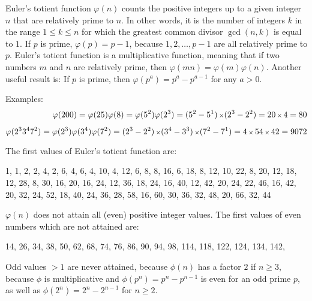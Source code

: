Euler's totient function $\varphi(n)$ counts the positive integers up to a given integer $n$ that are relatively prime to $n$.  In other words, it is the number of integers $k$ in the range $1 \le k \le n$ for which the greatest common divisor $\gcd(n, k)$ is equal to $1$. If $p$ is prime, $\varphi(p)=p-1$, because $1,2,\ldots,p-1$ are all relatively prime to $p$. Euler's totient function is a multiplicative function, meaning that if two numbers $m$ and $n$ are relatively prime, then $\varphi(mn)=\varphi(m)\varphi(n)$. Another useful result is: If $p$ is prime, then $\varphi(p^{a})=p^{a}-p^{a-1}$ for any $a>0$.

Examples: 
\begin{align*}
\varphi(200) 
 = \varphi(25) \varphi(8)
 = \varphi(5^{2}) \varphi(2^{3})
 = (5^{2}-5^{1}) \operatorname{\mbox{\scriptsize$\times$}} (2^{3}-2^{2})
 = 20 \operatorname{\mbox{\scriptsize$\times$}} 4
 = 80
\\[1ex]
\varphi(2^{3}3^{4}7^{2}) 
 = \varphi(2^{3}) \varphi(3^{4}) \varphi(7^{2})
 = (2^{3}-2^{2}) \operatorname{\mbox{\scriptsize$\times$}} (3^{4}-3^{3}) \operatorname{\mbox{\scriptsize$\times$}} (7^{2}-7^{1})
 = 4 \operatorname{\mbox{\scriptsize$\times$}} 54 \operatorname{\mbox{\scriptsize$\times$}} 42
 = 9072
\end{align*}

The first values of Euler's totient function are:
\begin{flushleft}
1, 1, 2, 2, 4, 2, 6, 4, 6, 4, 10, 4, 12, 6, 8, 8, 16, 6, 18, 8, 12, 10, 22, 8, 20, 12, 18, 12, 28, 8, 30, 16, 20, 16, 24, 12, 36, 18, 24, 16, 40, 12, 42, 20, 24, 22, 46, 16, 42, 20, 32, 24, 52, 18, 40, 24, 36, 28, 58, 16, 60, 30, 36, 32, 48, 20, 66, 32, 44
\end{flushleft}

$\varphi(n)$ does not attain all (even) positive integer values. The first values of even numbers which are not attained are:
\begin{flushleft}
14, 26, 34, 38, 50, 62, 68, 74, 76, 86, 90, 94, 98, 114, 118, 122, 124, 134, 142,
\end{flushleft}
Odd values $>1$ are never attained, because $\phi(n)$ has a factor $2$ if $n\ge 3$, because $\phi$ is multiplicative and $\phi(p^n)=p^n-p^{n-1}$ is even for an odd prime $p$, as well as $\phi(2^n)=2^n-2^{n-1}$ for $n\ge 2$.
